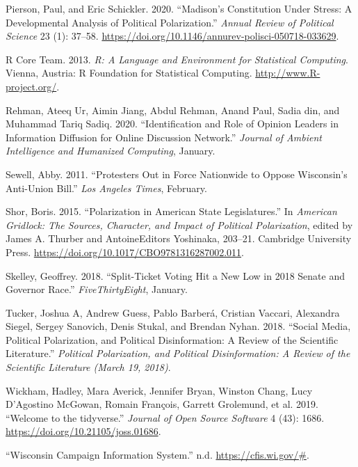 \documentclass[12pt,]{article}
\begin{document}
\leavevmode\hypertarget{ref-pierson2020}{}%
Pierson, Paul, and Eric Schickler. 2020. ``Madison's Constitution Under
Stress: A Developmental Analysis of Political Polarization.''
\emph{Annual Review of Political Science} 23 (1): 37--58.
\url{https://doi.org/10.1146/annurev-polisci-050718-033629}.

\leavevmode\hypertarget{ref-r}{}%
R Core Team. 2013. \emph{R: A Language and Environment for Statistical
Computing}. Vienna, Austria: R Foundation for Statistical Computing.
\url{http://www.R-project.org/}.

\leavevmode\hypertarget{ref-rehman2020}{}%
Rehman, Ateeq Ur, Aimin Jiang, Abdul Rehman, Anand Paul, Sadia din, and
Muhammad Tariq Sadiq. 2020. ``Identification and Role of Opinion Leaders
in Information Diffusion for Online Discussion Network.'' \emph{Journal
of Ambient Intelligence and Humanized Computing}, January.

\leavevmode\hypertarget{ref-sewell2011}{}%
Sewell, Abby. 2011. ``Protesters Out in Force Nationwide to Oppose
Wisconsin's Anti-Union Bill.'' \emph{Los Angeles Times}, February.

\leavevmode\hypertarget{ref-shor2015}{}%
Shor, Boris. 2015. ``Polarization in American State Legislatures.'' In
\emph{American Gridlock: The Sources, Character, and Impact of Political
Polarization}, edited by James A. Thurber and AntoineEditors Yoshinaka,
203--21. Cambridge University Press.
\url{https://doi.org/10.1017/CBO9781316287002.011}.

\leavevmode\hypertarget{ref-skelley2018}{}%
Skelley, Geoffrey. 2018. ``Split-Ticket Voting Hit a New Low in 2018
Senate and Governor Race.'' \emph{FiveThirtyEight}, January.

\leavevmode\hypertarget{ref-tucker2018}{}%
Tucker, Joshua A, Andrew Guess, Pablo Barberá, Cristian Vaccari,
Alexandra Siegel, Sergey Sanovich, Denis Stukal, and Brendan Nyhan.
2018. ``Social Media, Political Polarization, and Political
Disinformation: A Review of the Scientific Literature.'' \emph{Political
Polarization, and Political Disinformation: A Review of the Scientific
Literature (March 19, 2018)}.

\leavevmode\hypertarget{ref-tidyverse}{}%
Wickham, Hadley, Mara Averick, Jennifer Bryan, Winston Chang, Lucy
D'Agostino McGowan, Romain François, Garrett Grolemund, et al. 2019.
``Welcome to the tidyverse.'' \emph{Journal of Open Source Software} 4
(43): 1686. \url{https://doi.org/10.21105/joss.01686}.

\leavevmode\hypertarget{ref-cfis}{}%
``Wisconsin Campaign Information System.'' n.d.
\url{https://cfis.wi.gov/\#}.





\newpage
\singlespacing 
\end{document}
